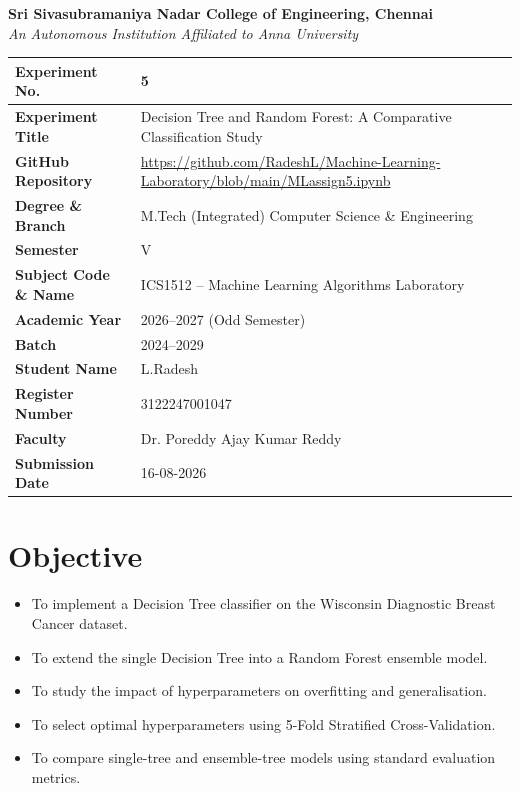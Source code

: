 \documentclass[12pt,a4paper]{article}
\begin{document}
\begin{center}
  \textbf{\large Sri Sivasubramaniya Nadar College of Engineering, Chennai}\\[4pt]
  \textit{An Autonomous Institution Affiliated to Anna University}\\[12pt]
\end{center}

\begin{tabular}{|p{4.5cm}|p{10.5cm}|}
\hline
\textbf{Experiment No.}   & 5 \\ \hline
\textbf{Experiment Title} & Decision Tree and Random Forest: A Comparative Classification Study \\ \hline
\textbf{GitHub Repository} & \url{https://github.com/RadeshL/Machine-Learning-Laboratory/blob/main/MLassign5.ipynb} \\ \hline
\textbf{Degree \& Branch} & M.Tech (Integrated) Computer Science \& Engineering \\ \hline
\textbf{Semester}         & V \\ \hline
\textbf{Subject Code \& Name} & ICS1512 -- Machine Learning Algorithms Laboratory \\ \hline
\textbf{Academic Year}    & 2026--2027 (Odd Semester) \\ \hline
\textbf{Batch}            & 2024--2029 \\ \hline
\textbf{Student Name}     & L.Radesh\\ \hline
\textbf{Register Number}  & 3122247001047\\ \hline
\textbf{Faculty}          & Dr. Poreddy Ajay Kumar Reddy \\ \hline
\textbf{Submission Date}  & 16-08-2026 \\ \hline
\end{tabular}

\vspace{1cm}

\section{Objective}
\begin{itemize}[noitemsep]
  \item To implement a Decision Tree classifier on the Wisconsin Diagnostic Breast Cancer dataset.
  \item To extend the single Decision Tree into a Random Forest ensemble model.
  \item To study the impact of hyperparameters on overfitting and generalisation.
  \item To select optimal hyperparameters using 5-Fold Stratified Cross-Validation.
  \item To compare single-tree and ensemble-tree models using standard evaluation metrics.
\end{itemize}
\end{document}
